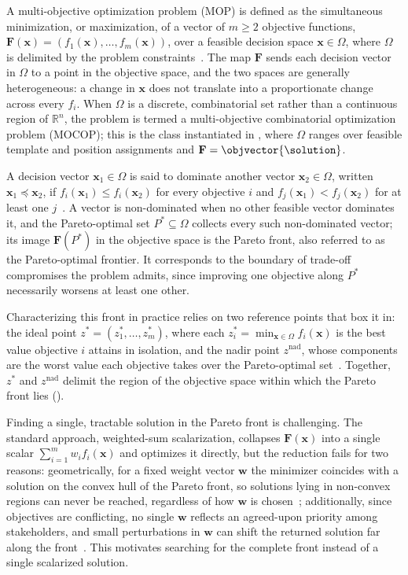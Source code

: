 A multi-objective optimization problem (MOP) is defined as the simultaneous minimization, or maximization, of a vector of $m \geq 2$ objective functions, $\mathbf{F}(\mathbf{x}) = (f_1(\mathbf{x}), \dots, f_m(\mathbf{x}))$, over a feasible decision space $\mathbf{x} \in \Omega$, where $\Omega$ is delimited by the problem constraints~\cite{pareto}. The map $\mathbf{F}$ sends each decision vector in $\Omega$ to a point in the objective space, and the two spaces are generally heterogeneous: a change in $\mathbf{x}$ does not translate into a proportionate change across every $f_i$. When $\Omega$ is a discrete, combinatorial set rather than a continuous region of $\mathbb{R}^n$, the problem is termed a multi-objective combinatorial optimization problem (MOCOP); this is the class instantiated in , where $\Omega$ ranges over feasible template and position assignments and $\mathbf{F} = \objvector{\solution}$.

A decision vector $\mathbf{x}_1 \in \Omega$ is said to dominate another vector $\mathbf{x}_2 \in \Omega$, written $\mathbf{x}_1 \preceq \mathbf{x}_2$, if $f_i(\mathbf{x}_1) \leq f_i(\mathbf{x}_2)$ for every objective $i$ and $f_j(\mathbf{x}_1) < f_j(\mathbf{x}_2)$ for at least one $j$~\cite{pareto}. A vector is non-dominated when no other feasible vector dominates it, and the Pareto-optimal set $P^\ast \subseteq \Omega$ collects every such non-dominated vector; its image $\mathbf{F}(P^\ast)$ in the objective space is the Pareto front, also referred to as the Pareto-optimal frontier. It corresponds to the boundary of trade-off compromises the problem admits, since improving one objective along $P^\ast$ necessarily worsens at least one other.

Characterizing this front in practice relies on two reference points that box it in: the ideal point $z^\ast = (z_1^\ast, \dots, z_m^\ast)$, where each $z_i^\ast = \min_{\mathbf{x} \in \Omega} f_i(\mathbf{x})$ is the best value objective $i$ attains in isolation, and the nadir point $z^{\mathrm{nad}}$, whose components are the worst value each objective takes over the Pareto-optimal set~\cite{pareto, wang-2017}. Together, $z^\ast$ and $z^{\mathrm{nad}}$ delimit the region of the objective space within which the Pareto front lies ().

Finding a single, tractable solution in the Pareto front is challenging. The standard approach, weighted-sum scalarization, collapses $\mathbf{F}(\mathbf{x})$ into a single scalar $\sum_{i=1}^m w_i f_i(\mathbf{x})$ and optimizes it directly, but the reduction fails for two reasons: geometrically, for a fixed weight vector $\mathbf{w}$ the minimizer coincides with a solution on the convex hull of the Pareto front, so solutions lying in non-convex regions can never be reached, regardless of how $\mathbf{w}$ is chosen~\cite{chiandussi-2012}; additionally, since objectives are conflicting, no single $\mathbf{w}$ reflects an agreed-upon priority among stakeholders, and small perturbations in $\mathbf{w}$ can shift the returned solution far along the front~\cite{savic_single-objective_2002}. This motivates searching for the complete front instead of a single scalarized solution.

